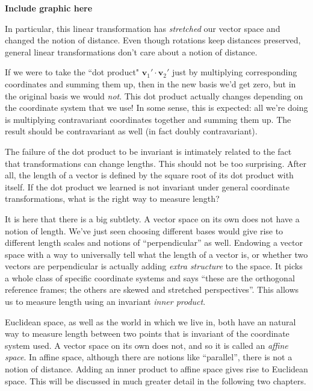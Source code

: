 \documentclass[../master.tex]{subfiles}
\begin{document}
	\textbf{Include graphic here}
	
	In particular, this linear transformation has \emph{stretched} our vector space and changed the notion of distance. Even though rotations keep distances preserved, general linear transformations don't care about a notion of distance. 
	
	If we were to take the ``dot product" $\mathbf v_1' \cdot \mathbf v_2'$ just by multiplying corresponding coordinates and summing them up, then in the new basis we'd get zero, but in the original basis we would \emph{not}. This dot product actually changes depending on the coordinate system that we use! In some sense, this is expected: all we're doing is multiplying contravariant coordinates together and summing them up. The result should be contravariant as well (in fact doubly contravariant).
	
	
	The failure of the dot product to be invariant is intimately related to the fact that transformations can change lengths. This should not be too surprising. After all, the length of a vector is defined by the square root of its dot product with itself. If the dot product we learned is not invariant under general coordinate transformations, what is the right way to measure length? 
	
	It is here that there is a big subtlety. A vector space on its own does not have a notion of length. We've just seen choosing different bases would give rise to different length scales and notions of ``perpendicular'' as well. Endowing a vector space with a way to universally tell what the length of a vector is, or whether two vectors are perpendicular is actually adding \emph{extra structure} to the space. It picks a whole class of specific coordinate systems and says ``these are the orthogonal reference frames; the others are skewed and stretched perspectives''. This allows us to measure length using an invariant \emph{inner product}. 
	
	Euclidean space, as well as the world in which we live in, both have an natural way to measure length between two points that is invariant of the coordinate system used. A vector space on its own does not, and so it is called an \emph{affine space}. In affine space, although there are notions like ``parallel'', there is not a notion of distance. Adding an inner product to affine space gives rise to Euclidean space. This will be discussed in much greater detail in the following two chapters. 
	
\end{document}
